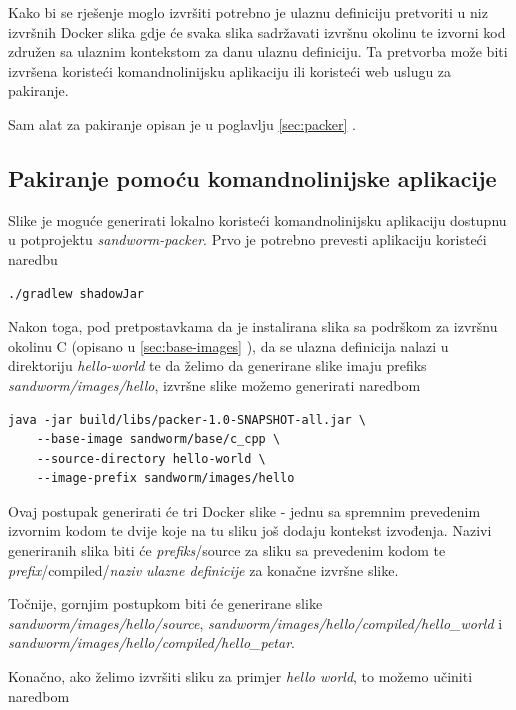 \documentclass[times, utf8, zavrsni]{fer}
\begin{document}
{{\begin{appendices}
Kako bi se rješenje moglo izvršiti potrebno je ulaznu definiciju pretvoriti u niz izvršnih Docker slika gdje će svaka slika sadržavati izvršnu okolinu te izvorni kod združen sa ulaznim kontekstom za danu ulaznu definiciju. Ta pretvorba može biti izvršena koristeći komandnolinijsku aplikaciju ili koristeći web uslugu za pakiranje.

Sam alat za pakiranje opisan je u poglavlju \ref{sec:packer} .

\subsection{Pakiranje pomoću komandnolinijske aplikacije}

Slike je moguće generirati lokalno koristeći komandnolinijsku aplikaciju dostupnu u potprojektu {\textit{sandworm-packer}}. Prvo je potrebno prevesti aplikaciju koristeći naredbu

\begin{lstlisting}
./gradlew shadowJar
\end{lstlisting}

Nakon toga, pod pretpostavkama da je instalirana slika sa podrškom za izvršnu okolinu C (opisano u \ref{sec:base-images} ), da se ulazna definicija nalazi u direktoriju {\textit{hello-world}} te da želimo da generirane slike imaju prefiks {\textit{sandworm/images/hello}}, izvršne slike možemo generirati naredbom

\begin{lstlisting}
java -jar build/libs/packer-1.0-SNAPSHOT-all.jar \
	--base-image sandworm/base/c_cpp \
	--source-directory hello-world \
	--image-prefix sandworm/images/hello
\end{lstlisting}

Ovaj postupak generirati će tri Docker slike - jednu sa spremnim prevedenim izvornim kodom te dvije koje na tu sliku još dodaju kontekst izvođenja. Nazivi generiranih slika biti će {\textit{prefiks}}/source za sliku sa prevedenim kodom te {\textit{prefix}}/compiled/{\textit{naziv ulazne definicije}} za konačne izvršne slike.

Točnije, gornjim postupkom biti će generirane slike {\textit{sandworm/images/hello/source}}, {\textit{sandworm/images/hello/compiled/hello\_world}} i {\textit{sandworm/images/hello/compiled/hello\_petar}}.

Konačno, ako želimo izvršiti sliku za primjer {\textit{hello world}}, to možemo učiniti naredbom


\end{appendices}}}
\end{document}
